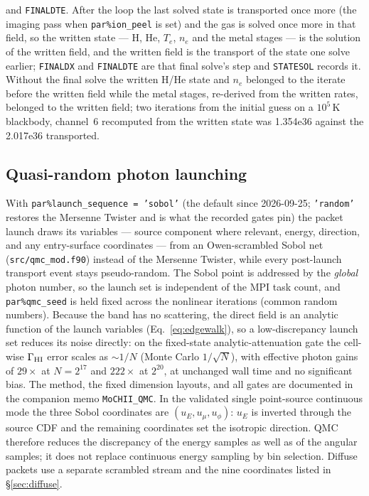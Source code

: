 \documentclass[english,a4paper]{my_memo}
\newcommand{\code}[1]{\texttt{#1}}
\begin{document}
and \code{FINALDTE}.
After the loop the last solved state is transported once more (the
imaging pass when \code{par\%ion\_peel} is set) and the gas is solved
once more in that field, so the written state --- H, He, $T_e$, $n_e$
and the metal stages --- is the solution of the written field, and the
written field is the transport of the state one solve earlier;
\code{FINALDX} and \code{FINALDTE} are that final solve's step and
\code{STATESOL} records it.  Without the final solve the written H/He
state and $n_e$ belonged to the iterate before the written field while the
metal stages, re-derived from the written rates, belonged to the written
field; two iterations from the initial guess on a $10^5$\,K blackbody,
channel~6 recomputed from the written state was 1.354e36 against the
2.017e36 transported.

\subsection{Quasi-random photon launching}
With \code{par\%launch\_sequence = 'sobol'} (the default since 2026-09-25;
\code{'random'} restores the Mersenne Twister and is what the recorded
gates pin) the packet launch draws its
variables --- source component where relevant, energy, direction, and any
entry-surface coordinates --- from an Owen-scrambled Sobol net
(\code{src/qmc\_mod.f90}) instead of the Mersenne Twister, while every
post-launch transport event stays pseudo-random.  The Sobol point is
addressed by the \emph{global} photon number, so the launch set is
independent of the MPI task count, and \code{par\%qmc\_seed} is held fixed
across the nonlinear iterations (common random numbers).  Because the band
has no scattering, the direct field is an analytic function of the launch
variables (Eq.~\ref{eq:edgewalk}), so a low-discrepancy launch set reduces
its noise directly: on the fixed-state analytic-attenuation gate the
cell-wise $\Gamma_{\rm HI}$ error scales as $\sim 1/N$ (Monte Carlo
$1/\sqrt{N}$), with effective photon gains of $29\times$ at $N = 2^{17}$ and
$222\times$ at $2^{20}$, at unchanged wall time and no significant bias.  The
method, the fixed dimension layouts, and all gates are documented in the
companion memo \code{MoCHII\_QMC}.  In the validated single point-source
continuous mode the three Sobol coordinates are
$(u_E,u_\mu,u_\phi)$: $u_E$ is inverted through the source CDF and the
remaining coordinates set the isotropic direction.  QMC therefore reduces
the discrepancy of the energy samples as well as of the angular samples;
it does not replace continuous energy sampling by bin selection.  Diffuse
packets use a separate scrambled stream and the nine coordinates listed in
\S\ref{sec:diffuse}.
\end{document}
